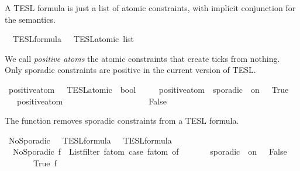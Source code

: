 \begin{isabellebody}
\begin{isamarkuptext}%
A TESL formula is just a list of atomic constraints, with implicit conjunction for the semantics.%
\end{isamarkuptext}\isamarkuptrue%
\isamarkupfalse%
\ {\isacharprime}{\isasymtau}\ TESL{\isacharunderscore}formula\ {\isacharequal}\ {\isacartoucheopen}{\isacharprime}{\isasymtau}\ TESL{\isacharunderscore}atomic\ list{\isacartoucheclose}%
\begin{isamarkuptext}%
We call \emph{positive atoms} the atomic constraints that create ticks from nothing.
  Only sporadic constraints are positive in the current version of TESL.%
\end{isamarkuptext}\isamarkuptrue%
\isamarkupfalse%
\ positive{\isacharunderscore}atom\ {\isacharcolon}{\isacharcolon}\ {\isacartoucheopen}{\isacharprime}{\isasymtau}\ TESL{\isacharunderscore}atomic\ {\isasymRightarrow}\ bool{\isacartoucheclose}\ \isanewline
\ \ \ \ {\isacartoucheopen}positive{\isacharunderscore}atom\ {\isacharparenleft}{\isacharunderscore}\ sporadic\ {\isacharunderscore}\ on\ {\isacharunderscore}{\isacharparenright}\ {\isacharequal}\ True{\isacartoucheclose}\isanewline
\ \ {\isacharbar}\ {\isacartoucheopen}positive{\isacharunderscore}atom\ {\isacharunderscore}\ \ \ \ \ \ \ \ \ \ \ \ \ \ \ \ \ \ \ {\isacharequal}\ False{\isacartoucheclose}%
\begin{isamarkuptext}%
The  function removes sporadic constraints from a TESL formula.%
\end{isamarkuptext}\isamarkuptrue%
\isamarkupfalse%
\ NoSporadic\ {\isacharcolon}{\isacharcolon}\ {\isacartoucheopen}{\isacharprime}{\isasymtau}\ TESL{\isacharunderscore}formula\ {\isasymRightarrow}\ {\isacharprime}{\isasymtau}\ TESL{\isacharunderscore}formula{\isacartoucheclose}\ \ \isanewline
\ \ {\isacartoucheopen}NoSporadic\ f\ {\isasymequiv}\ {\isacharparenleft}List{\isachardot}filter\ {\isacharparenleft}{\isasymlambda}f\isactrlsub a\isactrlsub t\isactrlsub o\isactrlsub m{\isachardot}\ case\ f\isactrlsub a\isactrlsub t\isactrlsub o\isactrlsub m\ of\isanewline
\ \ \ \ \ \ {\isacharunderscore}\ sporadic\ {\isacharunderscore}\ on\ {\isacharunderscore}\ {\isasymRightarrow}\ False\isanewline
\ \ \ \ {\isacharbar}\ {\isacharunderscore}\ {\isasymRightarrow}\ True{\isacharparenright}\ f{\isacharparenright}{\isacartoucheclose}%
\isadelimdocument
%
\endisadelimdocument
%
\isatagdocument
%
\end{isabellebody}
